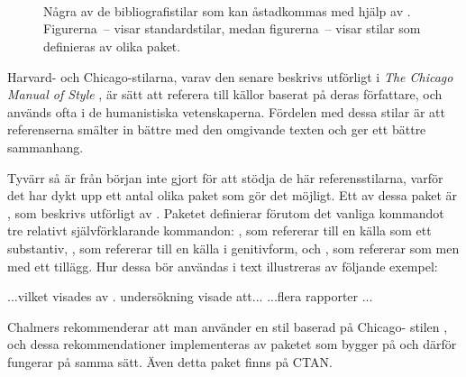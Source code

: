 \documentclass[lang=sv,ptsize=10pt,font=none,nomath,titles=bf,../../a4.tex]{subfiles}
\begin{document}
\begin{figure}[tp]
	\centering
	 \hfil %
	 \\ %
	 \hfil %
	 \\ %
	 \hfil %
	 \\ %
	\caption[Några av de bibliografistilar som kan åstadkommas med
	hjälp av \BibTeX.]{Några av de bibliografistilar som kan åstadkommas
	med hjälp av \BibTeX.
	Figurerna~– 
	visar standardstilar, medan  
	figurerna~– 
	visar stilar som definieras av olika paket.}
	\label{fig:bibstyle}
\end{figure}

\label{sec:5:harvard}
Harvard- och Chicago-stilarna, varav den senare beskrivs utförligt i
\emph{The Chicago Manual of Style} \parencite{Chicago10},
är sätt att referera till källor baserat
på deras författare, och används ofta i de humanistiska vetenskaperna.
Fördelen med dessa stilar är att referenserna smälter in bättre med den
omgivande texten och ger ett bättre sammanhang.

Tyvärr så är \BibTeX{} från början inte gjort för att stödja de här
referensstilarna, varför det har dykt upp ett antal olika paket som
gör det möjligt. Ett av dessa paket är , som beskrivs
utförligt av \textcite{Williams08}. Paketet definierar förutom det
vanliga kommandot  tre relativt självförklarande kommandon:
, som refererar till en källa som ett substantiv,
, som refererar till en källa i genitivform,
och , som refererar som  men med ett tillägg.
Hur dessa bör användas i text illustreras av följande exempel:
\begin{latexcode}
...vilket visades av .
 undersökning visade att...
...flera rapporter ...
\end{latexcode}
	
\label{sec:chscite}
Chalmers rekommenderar att man använder en stil baserad på Chicago-%
stilen \parencite{ChsLib10}, och dessa rekommendationer implementeras av 
paketet  som bygger på  och därför fungerar
på samma sätt. Även detta paket finns på CTAN.
\end{document}
